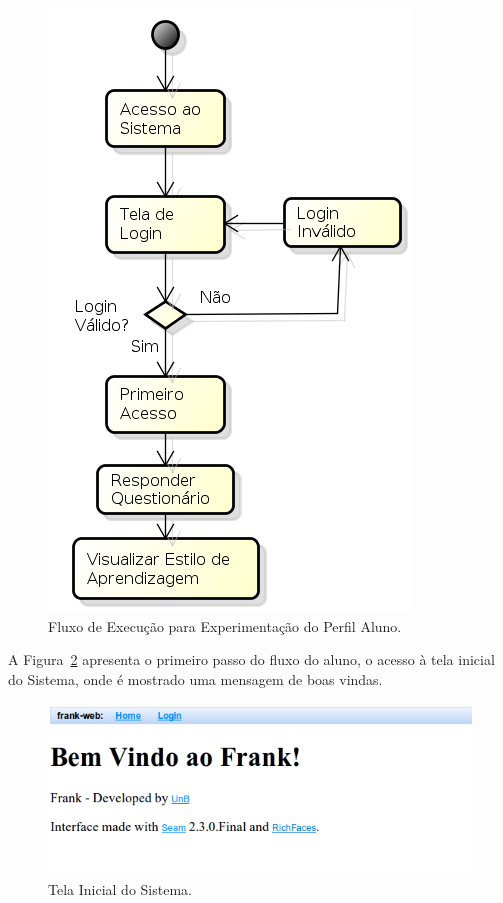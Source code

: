 \begin{figure}
	\centering
	\includegraphics[scale=0.6]{images/fluxo-aluno.png}
	\caption{Fluxo de Execução para Experimentação do Perfil Aluno.}
	\label{fig:fluxo-aluno}
\end{figure}

A Figura~\ref{fig:frank-tela-aluno-inicial} apresenta o primeiro passo do fluxo do aluno, o acesso à tela inicial do Sistema, onde é mostrado uma mensagem de boas vindas. 

\begin{figure}
	\centering
	\includegraphics[scale=0.6]{images/frank-tela-aluno-inicial.png}
	\caption{Tela Inicial do Sistema.}
	\label{fig:frank-tela-aluno-inicial}
\end{figure}

